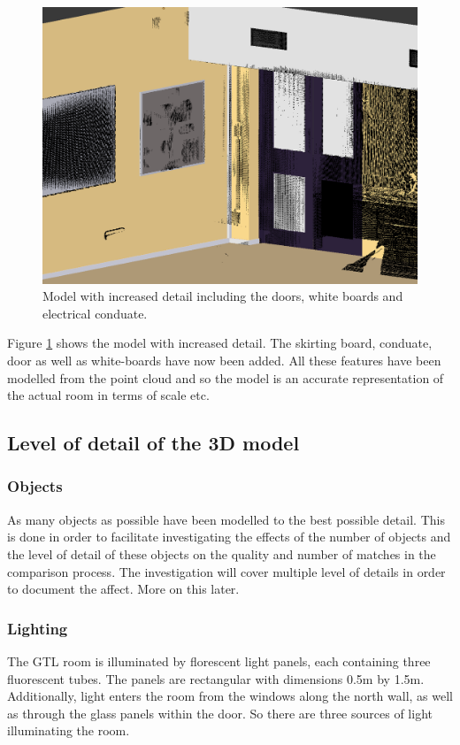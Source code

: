 \documentclass[11pt,a4paper]{report}
\begin{document}
				\begin{figure}[H]
					\centering
					\includegraphics[width=1\textwidth]{model_with_increased_detail}
					\caption[Detailed model]{Model with increased detail including the doors, white boards and electrical conduate.}
					\label{fig:more_complex_model}
				\end{figure}
				
				Figure \ref{fig:more_complex_model} shows the model with increased detail. The skirting board, conduate, door as well as white-boards have now been added. All these features have been modelled from the point cloud and so the model is an accurate representation of the actual room in terms of scale etc.
				
		\subsection{Level of detail of the 3D model}
			\subsubsection{Objects}
				As many objects as possible have been modelled to the best possible detail. This is done in order to facilitate investigating the effects of the number of objects and the level of detail of these objects on the quality and number of matches in the comparison process. The investigation will cover multiple level of details in order to document the affect. More on this later.
				
			\subsubsection{Lighting}
				The GTL room is illuminated by florescent light panels, each containing three fluorescent tubes. The panels are rectangular with dimensions 0.5m by 1.5m. Additionally, light enters the room from the windows along the north wall, as well as through the glass panels within the door. So there are three sources of light illuminating the room.
			
\end{document}
